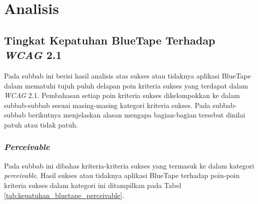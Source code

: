 \chapter{Analisis}
\label{chap:analisis}

\section{Tingkat Kepatuhan BlueTape Terhadap \textit{WCAG} 2.1}
\label{sec:kepatuhan_bluetape_terhadap_wcag_2.1}
Pada subbab ini berisi hasil analisis atas sukses atau tidaknya aplikasi BlueTape dalam mematuhi tujuh puluh delapan poin kriteria sukses yang terdapat dalam \textit{WCAG} 2.1. Pembahasan setiap poin kriteria sukses dikelompokkan ke dalam subbab-subbab sesuai masing-masing kategori kriteria sukses. Pada subbab-subbab berikutnya menjelaskan alasan mengapa bagian-bagian tersebut dinilai patuh atau tidak patuh.

\subsection{\textit{Perceivable}}
\label{subsec:kepatuhan_bluetape_perceivable}
Pada subbab ini dibahas kriteria-kriteria sukses yang termasuk ke dalam kategori \textit{perceivable}. Hasil sukses atau tidaknya aplikasi BlueTape terhadap poin-poin kriteria sukses dalam kategori ini ditampilkan pada Tabel \ref{tab:kepatuhan_bluetape_perceivable}.

